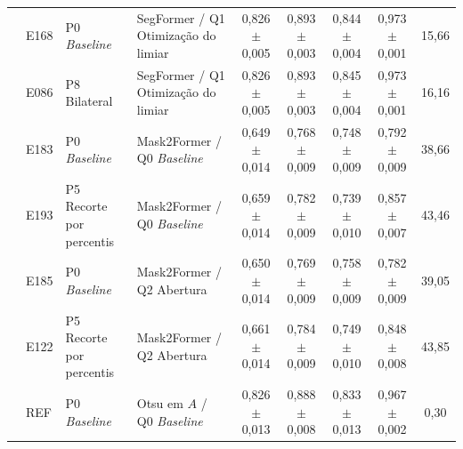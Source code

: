 \begin{table}[t]
\begin{tabularx}{\textwidth}{L{2.05cm} L{0.6cm} L{2.3cm} Y c c c c c}
 & E168 & P0 \textit{Baseline} & SegFormer / Q1 Otimização do limiar & 0,826{\scriptsize$\pm$0,005} & 0,893{\scriptsize$\pm$0,003} & 0,844{\scriptsize$\pm$0,004} & 0,973{\scriptsize$\pm$0,001} & 15,66 \\
 & E086 & P8 Bilateral & SegFormer / Q1 Otimização do limiar & 0,826{\scriptsize$\pm$0,005} & 0,893{\scriptsize$\pm$0,003} & 0,845{\scriptsize$\pm$0,004} & 0,973{\scriptsize$\pm$0,001} & 16,16 \\
\addlinespace
 & E183 & P0 \textit{Baseline} & Mask2Former / Q0 \textit{Baseline} & 0,649{\scriptsize$\pm$0,014} & 0,768{\scriptsize$\pm$0,009} & 0,748{\scriptsize$\pm$0,009} & 0,792{\scriptsize$\pm$0,009} & 38,66 \\
 & E193 & P5 Recorte por percentis & Mask2Former / Q0 \textit{Baseline} & 0,659{\scriptsize$\pm$0,014} & 0,782{\scriptsize$\pm$0,009} & 0,739{\scriptsize$\pm$0,010} & 0,857{\scriptsize$\pm$0,007} & 43,46 \\
 & E185 & P0 \textit{Baseline} & Mask2Former / Q2 Abertura & 0,650{\scriptsize$\pm$0,014} & 0,769{\scriptsize$\pm$0,009} & 0,758{\scriptsize$\pm$0,009} & 0,782{\scriptsize$\pm$0,009} & 39,05 \\
 & E122 & P5 Recorte por percentis & Mask2Former / Q2 Abertura & 0,661{\scriptsize$\pm$0,014} & 0,784{\scriptsize$\pm$0,009} & 0,749{\scriptsize$\pm$0,010} & 0,848{\scriptsize$\pm$0,008} & 43,85 \\
\addlinespace
 & REF & P0 \textit{Baseline} & Otsu em $A$ / Q0 \textit{Baseline} & 0,826{\scriptsize$\pm$0,013} & 0,888{\scriptsize$\pm$0,008} & 0,833{\scriptsize$\pm$0,013} & 0,967{\scriptsize$\pm$0,002} & 0,30 \\
\bottomrule
\end{tabularx}
\end{table}
